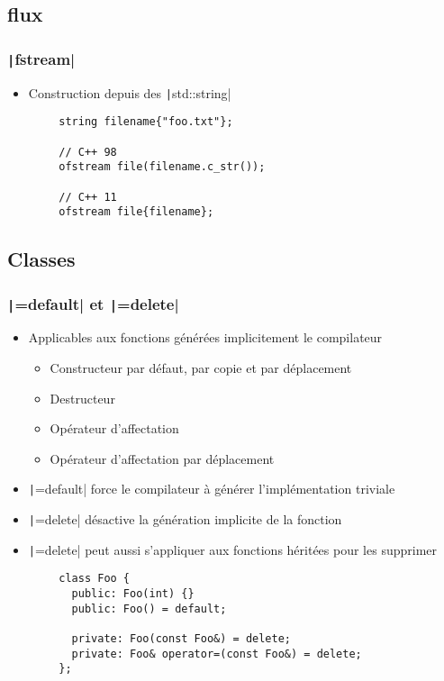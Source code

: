 \documentclass[C++.tex]{subfiles}
\begin{document}
\subsection*{flux}
\begin{frame}[fragile]
	\frametitle{\texttt|fstream|}
	\begin{itemize}
		\item Construction depuis des \texttt|std::string|
	\end{itemize}

	\begin{verbatim}
		string filename{"foo.txt"};

		// C++ 98
		ofstream file(filename.c_str());

		// C++ 11
		ofstream file{filename};
	\end{verbatim}
\end{frame}

\subsection*{Classes}
\begin{frame}[fragile]
	\frametitle{\texttt|=default| et \texttt|=delete|}
	\begin{itemize}
		\item Applicables aux fonctions générées implicitement le compilateur
		\begin{itemize}
			\item Constructeur par défaut, par copie et par déplacement
			\item Destructeur
			\item Opérateur d'affectation
			\item Opérateur d'affectation par déplacement
		\end{itemize}
		\item \texttt|=default| force le compilateur à générer l'implémentation triviale
		\item \texttt|=delete| désactive la génération implicite de la fonction
		\item \texttt|=delete| peut aussi s'appliquer aux fonctions héritées pour les supprimer
	\end{itemize}

	\begin{verbatim}
		class Foo {
		  public: Foo(int) {}
		  public: Foo() = default;

		  private: Foo(const Foo&) = delete;
		  private: Foo& operator=(const Foo&) = delete;
		};
	\end{verbatim}
\end{frame}
\end{document}
